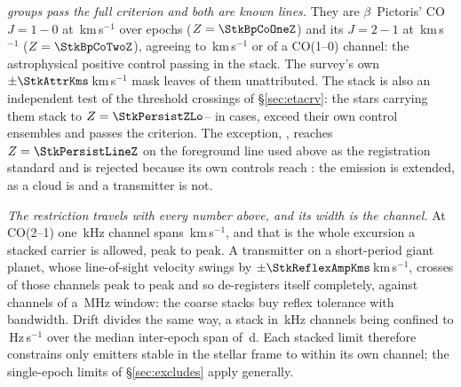\emph{\StkNSurvive{} groups pass the full criterion and both are known
lines.} They are $\beta$~Pictoris' CO $J=1\!-\!0$ at
\StkBpCoOneOff\,km\,s$^{-1}$ over \StkBpCoOneN{} epochs ($Z=\StkBpCoOneZ$)
and its $J=2\!-\!1$ at \StkBpCoTwoOff\,km\,s$^{-1}$ ($Z=\StkBpCoTwoZ$),
agreeing to \StkBpCrossKms\,km\,s$^{-1}$ or \StkBpCrossChan{} of a CO(1--0)
channel: the astrophysical positive control passing in the stack. The
survey's own $\pm\StkAttrKms$\,km\,s$^{-1}$ mask leaves
\StkNUnattributedComputed{} of them unattributed. The stack is also an independent test of the threshold
crossings of \S\ref{sec:etacrv}: the \StkNPersistStar{} stars carrying them
stack to $Z=\StkPersistZLo$--\StkPersistZHi{} in \StkNPersistBelow{} cases,
\StkNPersistAboveCtrl{} exceed their own control ensembles and
\StkNPersistSurvive{} passes the criterion. The exception,
\StkPersistLineStar, reaches $Z=\StkPersistLineZ$ on the foreground line
used above as the registration standard and is rejected because its own
controls reach \StkPersistLineCtrl: the emission is extended, as a cloud is
and a transmitter is not.

\emph{The restriction travels with every number above, and its width is the
channel.} At CO(2--1) one \StkRefChanKHz\,kHz channel spans
\StkTolFineKms\,km\,s$^{-1}$, and that is the whole excursion a stacked
carrier is allowed, peak to peak. A transmitter on a short-period giant
planet, whose line-of-sight velocity swings by
$\pm\StkReflexAmpKms$\,km\,s$^{-1}$, crosses \SzReflexPPChanFine{} of those
channels peak to peak and so de-registers itself completely, against
\SzReflexPPChanCoarse{} channels of a \ChanBModeMHz\,MHz window: the coarse
stacks buy reflex tolerance with bandwidth. Drift divides the same way, a
stack in \StkRefChanKHz\,kHz channels being confined to
\StkDriftTolHzS\,Hz\,s$^{-1}$ over the median inter-epoch span of
\StkSpanMedD\,d. Each stacked limit therefore constrains only emitters
stable in the stellar frame to within its own channel; the single-epoch
limits of \S\ref{sec:excludes} apply generally.
